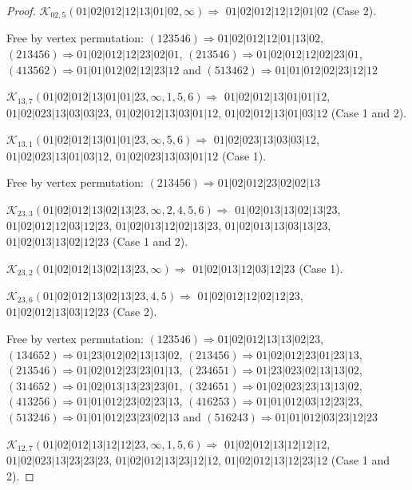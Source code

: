 \documentclass[12pt]{article}
\theoremstyle{plain}
\theoremstyle{definition}
\theoremstyle{remark}
\newcommand{\fancy}[1]{\mathcal{#1}}
\def\K{\fancy{K}}
\begin{document}
\begin{proof}
	$\K_{02,5}(01|02|012|12|13|01|02,\infty)\Rightarrow $ $01|02|012|12|12|01|02$ (Case 2).
	
	
	
	Free by vertex permutation: $(1 2 3 5 4 6)\Rightarrow 01|02|012|12|01|13|02$, $(2 1 3 4 5 6)\Rightarrow 01|02|012|12|23|02|01$, $(2 1 3 5 4 6)\Rightarrow 01|02|012|12|02|23|01$, $(4 1 3 5 6 2)\Rightarrow 01|01|012|02|12|23|12$ and $(5 1 3 4 6 2)\Rightarrow 01|01|012|02|23|12|12$
	
	
	
	\bigskip
	
	$\K_{13,7}(01|02|012|13|01|01|23,\infty,1, 5, 6)\Rightarrow $ $01|02|012|13|01|01|12$, $01|02|023|13|03|03|23$, $01|02|012|13|03|01|12$, $01|02|012|13|01|03|12$ (Case 1 and 2).
	
	$\K_{13,1}(01|02|012|13|01|01|23,\infty,5, 6)\Rightarrow $ $01|02|023|13|03|03|12$, $01|02|023|13|01|03|12$, $01|02|023|13|03|01|12$ (Case 1).
	
	
	
	Free by vertex permutation: $(2 1 3 4 5 6)\Rightarrow 01|02|012|23|02|02|13$
	
	
	
	\bigskip
	
	$\K_{23,3}(01|02|012|13|02|13|23,\infty,2, 4, 5, 6)\Rightarrow $ $01|02|013|13|02|13|23$, $01|02|012|12|03|12|23$, $01|02|013|12|02|13|23$, $01|02|013|13|03|13|23$, $01|02|013|13|02|12|23$ (Case 1 and 2).
	
	$\K_{23,2}(01|02|012|13|02|13|23,\infty)\Rightarrow $ $01|02|013|12|03|12|23$ (Case 1).
	
	$\K_{23,6}(01|02|012|13|02|13|23,4, 5)\Rightarrow $ $01|02|012|12|02|12|23$, $01|02|012|13|03|12|23$ (Case 2).
	
	
	
	Free by vertex permutation: $(1 2 3 5 4 6)\Rightarrow 01|02|012|13|13|02|23$, $(1 3 4 6 5 2)\Rightarrow 01|23|012|02|13|13|02$, $(2 1 3 4 5 6)\Rightarrow 01|02|012|23|01|23|13$, $(2 1 3 5 4 6)\Rightarrow 01|02|012|23|23|01|13$, $(2 3 4 6 5 1)\Rightarrow 01|23|023|02|13|13|02$, $(3 1 4 6 5 2)\Rightarrow 01|02|013|13|23|23|01$, $(3 2 4 6 5 1)\Rightarrow 01|02|023|23|13|13|02$, $(4 1 3 2 5 6)\Rightarrow 01|01|012|23|02|23|13$, $(4 1 6 2 5 3)\Rightarrow 01|01|012|03|12|23|23$, $(5 1 3 2 4 6)\Rightarrow 01|01|012|23|23|02|13$ and $(5 1 6 2 4 3)\Rightarrow 01|01|012|03|23|12|23$
	
	
	
	\bigskip
	
	$\K_{12,7}(01|02|012|13|12|12|23,\infty,1, 5, 6)\Rightarrow $ $01|02|012|13|12|12|12$, $01|02|023|13|23|23|23$, $01|02|012|13|23|12|12$, $01|02|012|13|12|23|12$ (Case 1 and 2).
	

\end{proof}
\end{document}
